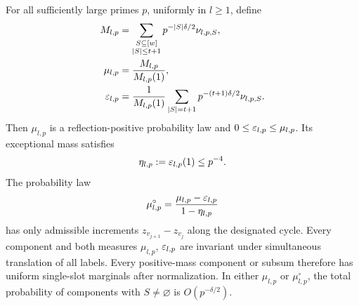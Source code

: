 \begin{proposition}
\label{tuple:laws}
For all sufficiently large primes $p$, uniformly in $l\ge1$, define
\begin{align*}
 M_{l,p}&=\sum_{\substack{S\subseteq[w]\\|S|\le t+1}}
                 p^{-|S|\delta/2}\nu_{l,p,S},\\
 \mu_{l,p}&=\frac{M_{l,p}}{M_{l,p}(1)},\\
 \varepsilon_{l,p}&=\frac{1}{M_{l,p}(1)}
       \sum_{|S|=t+1}p^{-(t+1)\delta/2}\nu_{l,p,S}.
\end{align*}
Then $\mu_{l,p}$ is a reflection-positive probability law and
$0\le\varepsilon_{l,p}\le\mu_{l,p}$.  Its exceptional mass satisfies
\[
 \eta_{l,p}:=\varepsilon_{l,p}(1)\le p^{-4}.
\]
The probability law
\[
 \mu_{l,p}^{\circ}
       =\frac{\mu_{l,p}-\varepsilon_{l,p}}{1-\eta_{l,p}}
\]
has only admissible increments $z_{v_{j+1}}-z_{v_j}$ along the
designated cycle.  Every component and both measures $\mu_{l,p}$,
$\varepsilon_{l,p}$ are invariant under simultaneous translation of all
labels.  Every positive-mass component or subsum therefore has uniform
single-slot marginals after normalization.  In either $\mu_{l,p}$ or
$\mu_{l,p}^{\circ}$, the total probability of components with
$S\ne\varnothing$ is $O(p^{-\delta/2})$.
\end{proposition}


